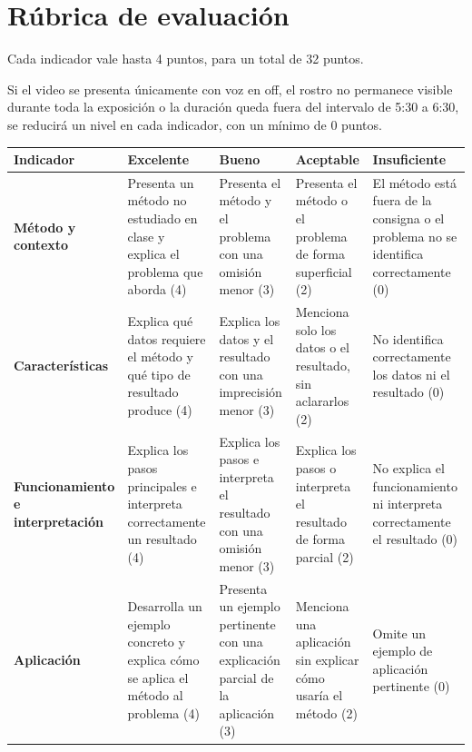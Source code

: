 \documentclass[a4,11pt]{aleph-notas}
\begin{document}
\clearpage
\section{Rúbrica de evaluación}

Cada indicador vale hasta 4 puntos, para un total de 32 puntos.

Si el video se presenta únicamente con voz en off, el rostro no permanece visible durante toda la exposición o la duración queda fuera del intervalo de 5:30 a 6:30, se reducirá un nivel en cada indicador, con un mínimo de 0 puntos.

\begin{center}\footnotesize
\begin{tabular}{L{3cm}*{4}{L{2.9cm}}}
\toprule
\textbf{Indicador} & \textbf{Excelente} & \textbf{Bueno} & \textbf{Aceptable} & \textbf{Insuficiente} \\ \midrule

\textbf{Método y contexto}
& Presenta un método no estudiado en clase y explica el problema que aborda (4)
& Presenta el método y el problema con una omisión menor (3)
& Presenta el método o el problema de forma superficial (2)
& El método está fuera de la consigna o el problema no se identifica correctamente (0) \\ \midrule

\textbf{Características}
& Explica qué datos requiere el método y qué tipo de resultado produce (4)
& Explica los datos y el resultado con una imprecisión menor (3)
& Menciona solo los datos o el resultado, sin aclararlos (2)
& No identifica correctamente los datos ni el resultado (0) \\ \midrule

\textbf{Funcionamiento e interpretación}
& Explica los pasos principales e interpreta correctamente un resultado (4)
& Explica los pasos e interpreta el resultado con una omisión menor (3)
& Explica los pasos o interpreta el resultado de forma parcial (2)
& No explica el funcionamiento ni interpreta correctamente el resultado (0) \\ \midrule

\textbf{Aplicación}
& Desarrolla un ejemplo concreto y explica cómo se aplica el método al problema (4)
& Presenta un ejemplo pertinente con una explicación parcial de la aplicación (3)
& Menciona una aplicación sin explicar cómo usaría el método (2)
& Omite un ejemplo de aplicación pertinente (0) \\ \midrule


\end{tabular}
\end{center}
\end{document}
